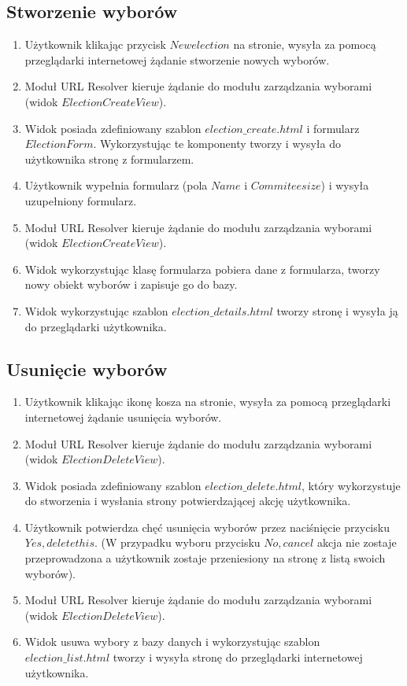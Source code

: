 \documentclass[pdflatex,11pt]{../aghdoc_version2}
\begin{document}
\subsection{Stworzenie wyborów}
\begin{enumerate}
\item Użytkownik klikając przycisk $New election$ na stronie, wysyła za pomocą
przeglądarki internetowej żądanie stworzenie nowych wyborów.
\item Moduł URL Resolver kieruje żądanie do modułu zarządzania wyborami (widok
$ElectionCreateView$).
\item Widok posiada zdefiniowany szablon $election\_create.html$ i formularz $ElectionForm$.
Wykorzystując te komponenty tworzy i wysyła do użytkownika stronę z formularzem.
\item Użytkownik wypełnia formularz (pola $Name$ i $Commitee size$) i wysyła uzupełniony
formularz.
\item Moduł URL Resolver kieruje żądanie do modułu zarządzania wyborami (widok
$ElectionCreateView$).
\item Widok wykorzystując klasę formularza pobiera dane z formularza, tworzy nowy
obiekt wyborów i zapisuje go do bazy.
\item Widok wykorzystując szablon $election\_details.html$ tworzy stronę i wysyła ją do
przeglądarki użytkownika.
\end{enumerate}

\subsection{Usunięcie wyborów}
\begin{enumerate}
\item Użytkownik klikając ikonę kosza na stronie, wysyła za pomocą przeglądarki
internetowej żądanie usunięcia wyborów.
\item Moduł URL Resolver kieruje żądanie do modułu zarządzania wyborami (widok
$ElectionDeleteView$).
\item Widok posiada zdefiniowany szablon $election\_delete.html$, który wykorzystuje do
stworzenia i wysłania strony potwierdzającej akcję użytkownika.
\item Użytkownik potwierdza chęć usunięcia wyborów przez naciśnięcie przycisku $Yes,
delete this.$ (W przypadku wyboru przycisku $No, cancel$ akcja nie zostaje przeprowadzona a użytkownik zostaje przeniesiony na stronę z listą swoich
wyborów).
\item Moduł URL Resolver kieruje żądanie do modułu zarządzania wyborami (widok
$ElectionDeleteView$).
\item Widok usuwa wybory z bazy danych i wykorzystując szablon $election\_list.html$ tworzy
i wysyła stronę do przeglądarki internetowej użytkownika.
\end{enumerate}
\end{document}
